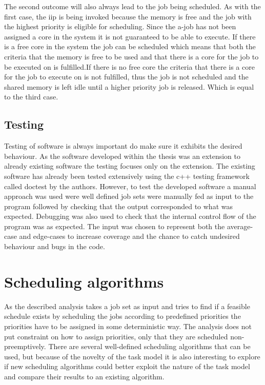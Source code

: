 \documentclass{kththesis}
\begin{document}
The second outcome will also always lead to the job being scheduled. As with the first case, the
\acrshort{iip} is being invoked because the memory is free and the job with the highest priority is
eligible for scheduling. Since the \acrshort{a}-job has not been assigned a core in the system
it is not guaranteed to be able to execute. If there is a free core in the system the job can be
scheduled which means that both the criteria that the memory is free to be used and that there is a
core for the job to be executed on is fulfilled.If there is no free core the criteria that there is
a core for the job to execute on is not fulfilled, thus the job is not scheduled and the shared
memory is left idle until a higher priority job is released. Which is equal to the third case.


\subsection{Testing}

Testing of software is always important do make sure it exhibits the desired behaviour. As the
software developed within the thesis was an extension to already existing software the testing
focuses only on the extension. The existing software has already been tested extensively using the
c++ testing framework called doctest by the authors. However, to test the developed software a
manual approach was used were well defined job sets were manually fed as input to the program
followed by checking that the output corresponded to what was expected. Debugging was also used to
check that the internal control flow of the program was as expected. The input was chosen to
represent both the average-case and edge-cases to increase coverage and the chance to catch
undesired behaviour and bugs in the code.


\section{Scheduling algorithms} \label{sec:scheduling_algorithms}

As the described analysis takes a job set as input and tries to find if a feasible schedule exists
by scheduling the jobs according to predefined priorities the priorities have to be assigned in some
deterministic way. The analysis does not put constraint on how to assign priorities, only that they
are scheduled non-preemptively. There are several well-defined scheduling algorithms that can be
used, but because of the novelty of the task model it is also interesting to explore if new
scheduling algorithms could better exploit the nature of the task model and compare their results to
an existing algorithm.
\end{document}
